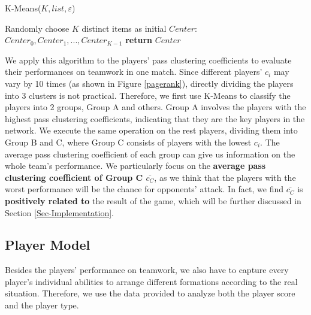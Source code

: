 \documentclass{mcmthesis}
\begin{document}
\begin{algorithm}
\caption{K-Means($K, list, \varepsilon$)}
Randomly choose $K$ distinct items as initial $Center$: $Center_0, Center_1, ..., Center_{K-1}$ \newline
{}
\textbf{return} $Center$
\end{algorithm}

We apply this algorithm to the players' pass clustering coefficients to evaluate their performances on teamwork in one match. Since different players' $c_{i}$ may vary by 10 times (as shown in Figure \ref{pagerank}), directly dividing the players into 3 clusters is not practical. Therefore, we first use K-Means to classify the players into 2 groups, Group A and others. Group A involves the players with the highest pass clustering coefficients, indicating that they are the key players in the network. We execute the same operation on the rest players, dividing them into Group B and C, where Group C consists of players with the lowest $c_{i}$. The average pass clustering coefficient of each group can give us information on the whole team's performance. We particularly focus on the \textbf{average pass clustering coefficient of Group C $\overline{c_{C}}$}, as we think that the players with the worst performance will  be the chance for opponents' attack. In fact, we find $\overline{c_{C}}$ is \textbf{positively related to} the result of the game, which will be further discussed in Section \ref{Sec-Implementation}.
\subsection{Player Model}\label{Sec:single}
Besides the players' performance on teamwork,  we also have to capture every player's individual abilities to arrange different formations according to the real situation. Therefore, we use the data provided to analyze both the player score and the player type.
\end{document}
